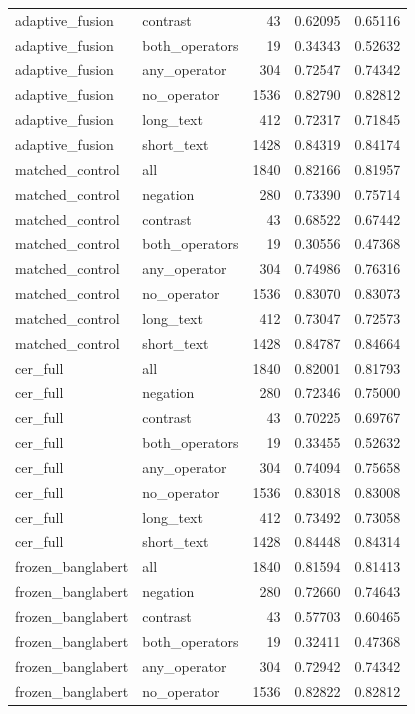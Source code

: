 \begin{tabular}{llrrr}
adaptive_fusion & contrast & 43 & 0.62095 & 0.65116 \\
adaptive_fusion & both_operators & 19 & 0.34343 & 0.52632 \\
adaptive_fusion & any_operator & 304 & 0.72547 & 0.74342 \\
adaptive_fusion & no_operator & 1536 & 0.82790 & 0.82812 \\
adaptive_fusion & long_text & 412 & 0.72317 & 0.71845 \\
adaptive_fusion & short_text & 1428 & 0.84319 & 0.84174 \\
matched_control & all & 1840 & 0.82166 & 0.81957 \\
matched_control & negation & 280 & 0.73390 & 0.75714 \\
matched_control & contrast & 43 & 0.68522 & 0.67442 \\
matched_control & both_operators & 19 & 0.30556 & 0.47368 \\
matched_control & any_operator & 304 & 0.74986 & 0.76316 \\
matched_control & no_operator & 1536 & 0.83070 & 0.83073 \\
matched_control & long_text & 412 & 0.73047 & 0.72573 \\
matched_control & short_text & 1428 & 0.84787 & 0.84664 \\
cer_full & all & 1840 & 0.82001 & 0.81793 \\
cer_full & negation & 280 & 0.72346 & 0.75000 \\
cer_full & contrast & 43 & 0.70225 & 0.69767 \\
cer_full & both_operators & 19 & 0.33455 & 0.52632 \\
cer_full & any_operator & 304 & 0.74094 & 0.75658 \\
cer_full & no_operator & 1536 & 0.83018 & 0.83008 \\
cer_full & long_text & 412 & 0.73492 & 0.73058 \\
cer_full & short_text & 1428 & 0.84448 & 0.84314 \\
frozen_banglabert & all & 1840 & 0.81594 & 0.81413 \\
frozen_banglabert & negation & 280 & 0.72660 & 0.74643 \\
frozen_banglabert & contrast & 43 & 0.57703 & 0.60465 \\
frozen_banglabert & both_operators & 19 & 0.32411 & 0.47368 \\
frozen_banglabert & any_operator & 304 & 0.72942 & 0.74342 \\
frozen_banglabert & no_operator & 1536 & 0.82822 & 0.82812 \\

\end{tabular}
